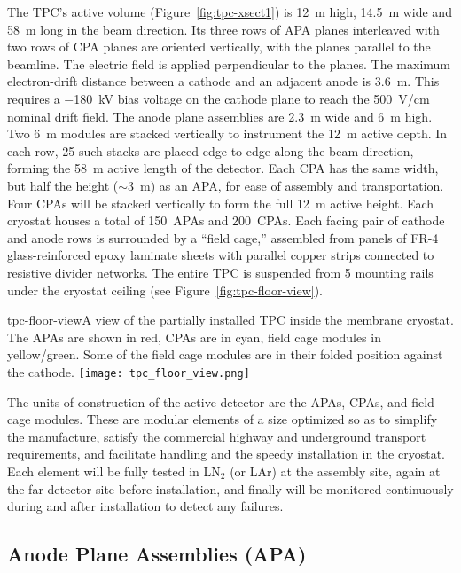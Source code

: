 The TPC's active volume (Figure~\ref{fig:tpc-xsect1}) is 12~m high,
14.5~m wide and 58~m long in the beam direction.  Its three rows of
APA planes interleaved with two rows of CPA planes are oriented
vertically, with the planes parallel to the beamline. The electric
field is applied perpendicular to the planes.  The maximum
electron-drift distance between a cathode and an adjacent anode is
3.6~m. This requires a $-$180~kV bias voltage on the cathode plane to
reach the 500~V/cm nominal drift field. The anode plane assemblies are
2.3~m wide and 6~m high. Two 6~m modules are stacked vertically to
instrument the 12~m active depth. In each row, 25 such stacks are
placed edge-to-edge along the beam direction, forming the 58~m active
length of the detector.  Each CPA has the same width, but half the
height ($\sim$3~m) as an APA, for ease of assembly and transportation.
Four CPAs will be stacked vertically to form the full 12~m active
height.  Each cryostat houses a total of 150~APAs and 200~CPAs.  Each
facing pair of cathode and anode rows is surrounded by a ``field
cage,'' assembled from panels of FR-4 glass-reinforced epoxy laminate
sheets with parallel copper strips connected to resistive divider
networks.  The entire TPC is suspended from 5 mounting rails under the
cryostat ceiling (see Figure~\ref{fig:tpc-floor-view}).
\begin{cdrfigure}{tpc-floor-view}{A view of the partially installed TPC inside the membrane cryostat.  The APAs are shown in red, CPAs are in cyan, field cage modules in yellow/green. Some of the field cage modules are in their folded position against the cathode.}
\texttt{[image: tpc\_floor\_view.png]}
\end{cdrfigure}

The units of construction of the active detector are the APAs, CPAs,
and field cage modules. These are modular elements of a size optimized
so as to simplify the manufacture, satisfy the commercial highway and
underground transport requirements, and facilitate handling and the
speedy installation in the cryostat.  Each element will be fully
tested in LN$_2$ (or LAr) at the assembly site, again at the far
detector site before installation, and finally will be monitored
continuously during and after installation to detect any failures.


\subsection{Anode Plane Assemblies (APA)}
\label{subsec:fd-ref-apa}

